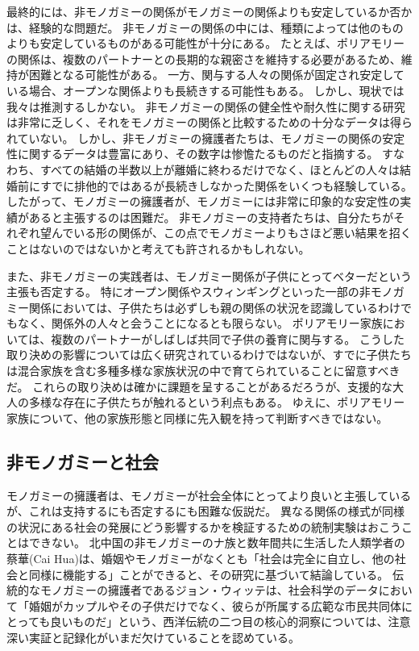 \documentclass[paper=a4,book,openany]{jlreq} \usepackage{mystyle}
\begin{document}
最終的には、非モノガミーの関係がモノガミーの関係よりも安定しているか否かは、経験的な問題だ。
非モノガミーの関係の中には、種類によっては他のものよりも安定しているものがある可能性が十分にある。
たとえば、ポリアモリーの関係は、複数のパートナーとの長期的な親密さを維持する必要があるため、維持が困難となる可能性がある。
一方、関与する人々の関係が固定され安定している場合、オープンな関係よりも長続きする可能性もある。
しかし、現状では我々は推測するしかない。
非モノガミーの関係の健全性や耐久性に関する研究は非常に乏しく、それをモノガミーの関係と比較するための十分なデータは得られていない。
しかし、非モノガミーの擁護者たちは、モノガミーの関係の安定性に関するデータは豊富にあり、その数字は惨憺たるものだと指摘する。
すなわち、すべての結婚の半数以上が離婚に終わるだけでなく、ほとんどの人々は結婚前にすでに排他的ではあるが長続きしなかった関係をいくつも経験している。
したがって、モノガミーの擁護者が、モノガミーには非常に印象的な安定性の実績があると主張するのは困難だ。
非モノガミーの支持者たちは、自分たちがそれぞれ望んでいる形の関係が、この点でモノガミーよりもさほど悪い結果を招くことはないのではないかと考えても許されるかもしれない。

また、非モノガミーの実践者は、モノガミー関係が子供にとってベターだという主張も否定する。
特にオープン関係やスウィンギングといった一部の非モノガミー関係においては、子供たちは必ずしも親の関係の状況を認識しているわけでもなく、関係外の人々と会うことになるとも限らない。
ポリアモリー家族においては、複数のパートナーがしばしば共同で子供の養育に関与する。
こうした取り決めの影響については広く研究されているわけではないが、すでに子供たちは混合家族を含む多種多様な家族状況の中で育てられていることに留意すべきだ。
これらの取り決めは確かに課題を呈することがあるだろうが、支援的な大人の多様な存在に子供たちが触れるという利点もある。
ゆえに、ポリアモリー家族について、他の家族形態と同様に先入観を持って判断すべきではない\citep[p.191]{sheff15:_polyam_next_door}。

\subsection{非モノガミーと社会}

モノガミーの擁護者は、モノガミーが社会全体にとってより良いと主張しているが、これは支持するにも否定するにも困難な仮説だ。
異なる関係の様式が同様の状況にある社会の発展にどう影響するかを検証するための統制実験はおこうことはできない。
北中国の非モノガミーのナ族と数年間共に生活した人類学者の蔡華(Cai Hua)は、婚姻やモノガミーがなくとも「社会は完全に自立し、他の社会と同様に機能する」ことができると、その研究に基づいて結論している\citep{hua03:_societ_without_father_husban}。
伝統的なモノガミーの擁護者であるジョン・ウィッテは、社会科学のデータにおいて「婚姻がカップルやその子供だけでなく、彼らが所属する広範な市民共同体にとっても良いものだ」という、西洋伝統の二つ目の核心的洞察については、注意深い実証と記録化がいまだ欠けていることを認めている\citep[p.1070]{witte01:_goods_goals_marriag}。
\end{document}
